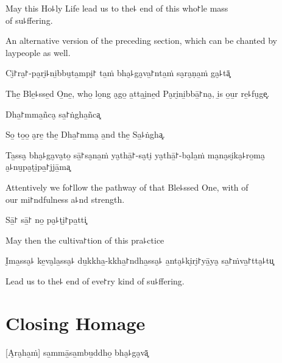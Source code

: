 \begin{english}
  May this Ho꜕ly Life lead us to the꜕ end of this who꜓le mass\\ of su꜕ffering.
\end{english}

\clearpage

\begin{instruction}
  An alternative version of the preceding section, which can be chanted by laypeople as well.
\end{instruction}

Ci̮꜓ra̮꜓-pa̮ri̮꜕ni̱bbu̮ta̱mpi̮꜓ ta̱ṁ bha̮꜕ga̮va̱꜓nta̱ṁ sa̮ra̮ṇa̱ṁ ga̮꜕tā͓

\begin{english}
  The̱ Ble̱꜕sse̱d O̱ne̱, who̱ lo̱ng a̮go̱ a̱tta̱i̮ne̱d Pa̮ri̮ni̱bbā̱꜓na̮, i̱s o̱u̱r re̱꜕fu̮ge͓.
\end{english}

Dha̱꜓mma̱ñca̮ sa̱꜓ṅgha̱ñca͓

\begin{english}
  So̱ to̱o̱ a̮re̱ the̱ Dha̱꜓mma̮ a̱nd the̱ Sa̱꜕ṅgha͓.
\end{english}

Ta̱ssa̮ bha̮꜕ga̮va̮to̱ sā̱꜓sa̮na̱ṁ ya̮thā̱꜓-sa̮ti̮ ya̮thā̱꜓-ba̮la̱ṁ ma̮na̮si̮ka̮꜕ro̱ma̮ a̮꜕nu̮pa̮ṭi̮pa̱꜓jjā̱ma͓

\begin{english}
  Attentively we fo꜓llow the pathway of that Ble꜕ssed One, with  of \\our mi꜓ndfulness a꜕nd strength.
\end{english}

Sā̱꜓ sā̱꜓ no̱ pa̮꜕ṭi̮꜓pa̱tti͓

\begin{english}
  May then the cultiva꜓tion of this pra꜕ctice
\end{english}

I̮ma̱ssa̮꜕ ke̱va̮la̱ssa̮꜕ du̱kkha̱-kkha̱꜓ndha̱ssa̮꜕ a̱nta̮꜕ki̮ri̮꜓yā̱ya̮ sa̱꜓ṁva̱꜓tta̮꜕tu͓

\begin{english}
  Lead us to the꜕ end of eve꜓ry kind of su꜕ffering.
\end{english}

\clearpage

\chapter{Closing Homage}

[A̮ra̮ha̱ṁ] sa̱mmā̱sa̱mbu̱ddho̱ bha̮꜕ga̮vā͓

